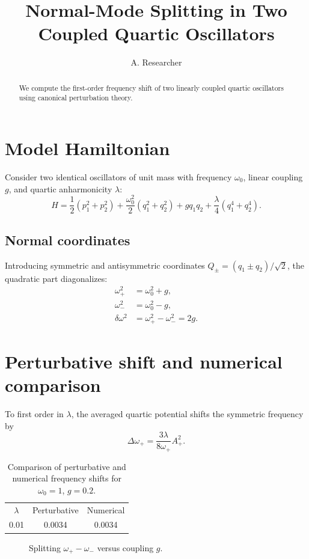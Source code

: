 \documentclass[aps,prb,twocolumn]{revtex4-2}
\begin{document}
\title{Normal-Mode Splitting in Two Coupled Quartic Oscillators}
\author{A. Researcher}
\begin{abstract}
We compute the first-order frequency shift of two linearly coupled quartic oscillators using canonical perturbation theory.
\end{abstract}
\maketitle
\section{Model Hamiltonian}\label{sec:ham}
Consider two identical oscillators of unit mass with frequency $\omega_0$, linear coupling $g$, and quartic anharmonicity $\lambda$:
\begin{equation}\label{eq:ham-total}
H = \frac{1}{2}(p_1^2 + p_2^2) + \frac{\omega_0^2}{2}(q_1^2 + q_2^2) + g q_1 q_2 + \frac{\lambda}{4}(q_1^4 + q_2^4).
\end{equation}
\subsection{Normal coordinates}\label{sec:normal}
Introducing symmetric and antisymmetric coordinates $Q_{\pm} = (q_1 \pm q_2)/\sqrt{2}$, the quadratic part diagonalizes:
\begin{align}
\omega_+^2 &= \omega_0^2 + g, \label{eq:omega-plus} \\
\omega_-^2 &= \omega_0^2 - g, \label{eq:omega-minus} \\
\delta\omega^2 &= \omega_+^2 - \omega_-^2 = 2g. \nonumber
\end{align}
\section{Perturbative shift and numerical comparison}\label{sec:shift}
To first order in $\lambda$, the averaged quartic potential shifts the symmetric frequency by
\begin{equation}\label{eq:shift}
\Delta\omega_+ = \frac{3\lambda}{8\omega_+} A_+^2.
\end{equation}
\begin{table}[h]
\caption{Comparison of perturbative and numerical frequency shifts for $\omega_0=1$, $g=0.2$.}\label{tab:shifts}
\begin{tabular}{ccc}
$\lambda$ & Perturbative & Numerical \\
0.01 & 0.0034 & 0.0034 \\
\end{tabular}
\end{table}
\begin{figure}[t]
\caption{Splitting $\omega_+ - \omega_-$ versus coupling $g$.}\label{fig:split}
\end{figure}

\end{document}

